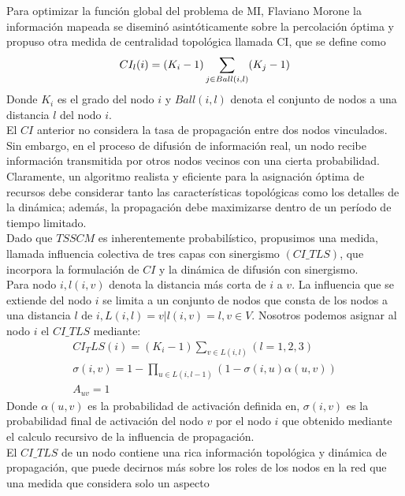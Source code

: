 \documentclass{article}
\begin{document}
Para optimizar la función global del problema de MI, Flaviano Morone \cite{cite:30} la información mapeada se diseminó asintóticamente sobre la percolación óptima y propuso otra medida de centralidad topológica llamada CI, que se define como \\
\begin{equation}
	\centering
	CI_l(i) = (K_i - 1) \sum_{j \in Ball (i,l)} (K_j-1)
\end{equation}
Donde $K_i$ es el grado del nodo $i$ y $Ball (i,l)$ denota el conjunto de nodos a una distancia $l$ del nodo $i$.\\

El $CI$ anterior no considera la tasa de propagación entre dos nodos vinculados. Sin embargo, en el proceso de difusión de información real, un nodo recibe información transmitida por otros nodos vecinos con una cierta probabilidad. Claramente, un algoritmo realista y eficiente para la asignación óptima de recursos debe considerar tanto las características topológicas como los detalles de la dinámica; además, la propagación debe maximizarse dentro de un período de tiempo limitado. \\
Dado que $TSSCM$ es inherentemente probabilístico, propusimos una medida, llamada influencia colectiva de tres capas con sinergismo $(CI\_TLS)$, que incorpora la formulación de $CI$ y la dinámica de difusión con sinergismo. \\

Para nodo $i, l(i,v)$ denota la distancia más corta de $i$ a $v$. 
La influencia que se extiende del nodo $i$ se limita a un conjunto de nodos que consta de los nodos a una distancia $l$ de $i, L(i,l) = {v|l(i,v) = l, v \in V}$. Nosotros podemos asignar al nodo $i$ el $CI\_TLS$ mediante:
\begin{eqnarray}
	CI_TLS(i) = (K_i - 1) \sum_{v \in L(i,l)} (l = 1,2,3)\\
	\sigma(i,v) = 1 - \prod_{u \in L(i,l-1)} (1-\sigma(i,u)\alpha(u,v))\\
   A_{uv} = 1
\end{eqnarray}
Donde $\alpha(u,v)$ es la probabilidad de activación definida en, $\sigma(i,v)$ es la probabilidad final de activación del nodo $v$ por el nodo $i$ que obtenido mediante el calculo recursivo de la influencia de propagación. \\
El $CI\_TLS$ de un nodo contiene una rica información topológica y dinámica de propagación, que puede decirnos más sobre los roles de los nodos en la red que una medida que considera solo un aspecto
\end{document}
